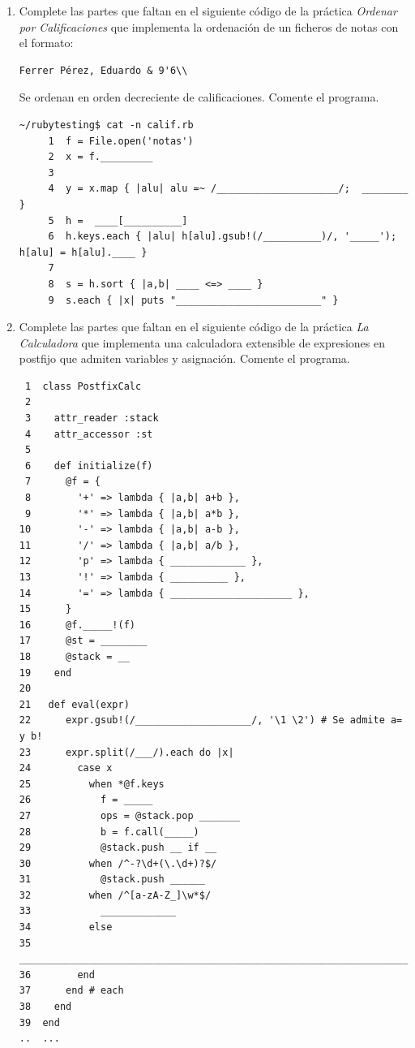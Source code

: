 \begin{enumerate}
\begin{verbatim}
    result[n] = getResult(read[n])
    deb "Finished process '____' pid=____ with status #{s} result = ____________"
  }
  ______
end

res = prun(
     :one     => lambda { |n| "#{n} is 1" },
     :three   => lambda { |n| "#{n} is 3" },
     'two'    => lambda { |n| n*4 }
)
\end{verbatim}
\item
Complete las partes que faltan en el siguiente código 
de la práctica {\it Ordenar por Calificaciones}
que implementa la ordenación de un ficheros
de notas 
con el formato:
\begin{verbatim}
Ferrer Pérez, Eduardo & 9'6\\
\end{verbatim}
Se ordenan en orden decreciente de calificaciones.
Comente el programa.
\begin{verbatim}
~/rubytesting$ cat -n calif.rb 
     1  f = File.open('notas')
     2  x = f._________
     3  
     4  y = x.map { |alu| alu =~ /_____________________/;  ________ }
     5  h =  ____[__________]
     6  h.keys.each { |alu| h[alu].gsub!(/__________)/, '_____'); h[alu] = h[alu].____ }
     7  
     8  s = h.sort { |a,b| ____ <=> ____ }
     9  s.each { |x| puts "_________________________" }
\end{verbatim}

\item
Complete las partes que faltan en el siguiente código 
de la práctica {\it  La Calculadora}
que implementa una calculadora extensible 
de expresiones en postfijo
que admiten variables y asignación.
Comente el programa. %
\begin{verbatim}
 1  class PostfixCalc
 2  
 3    attr_reader :stack
 4    attr_accessor :st
 5  
 6    def initialize(f) 
 7      @f = {
 8        '+' => lambda { |a,b| a+b },
 9        '*' => lambda { |a,b| a*b },
10        '-' => lambda { |a,b| a-b },
11        '/' => lambda { |a,b| a/b },
12        'p' => lambda { _____________ },
13        '!' => lambda { __________ },
14        '=' => lambda { _____________________ },
15      }
16      @f._____!(f)
17      @st = ________
18      @stack = __
19    end
20  
21   def eval(expr)
22      expr.gsub!(/____________________/, '\1 \2') # Se admite a= y b!
23      expr.split(/___/).each do |x|
24        case x
25          when *@f.keys
26            f = _____
27            ops = @stack.pop _______
28            b = f.call(_____)
29            @stack.push __ if __
30          when /^-?\d+(\.\d+)?$/
31            @stack.push ______
32          when /^[a-zA-Z_]\w*$/
33            _____________
34          else
35            ___________________________________________________________________       
36        end
37      end # each
38    end
39  end
..  ...
\end{verbatim}


\end{enumerate}
